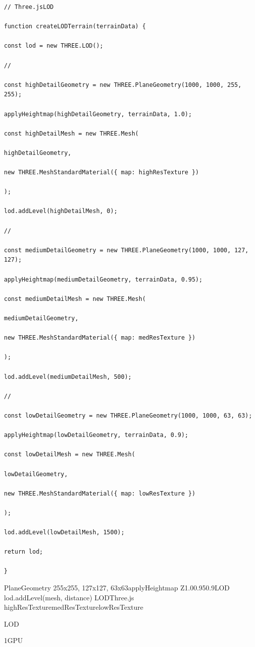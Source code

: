 \begin{lstlisting}[style=javascript]
// Three.jsLOD

function createLODTerrain(terrainData) {

const lod = new THREE.LOD();

// 

const highDetailGeometry = new THREE.PlaneGeometry(1000, 1000, 255, 255);

applyHeightmap(highDetailGeometry, terrainData, 1.0);

const highDetailMesh = new THREE.Mesh(

highDetailGeometry,

new THREE.MeshStandardMaterial({ map: highResTexture })

);

lod.addLevel(highDetailMesh, 0);

// 

const mediumDetailGeometry = new THREE.PlaneGeometry(1000, 1000, 127, 127);

applyHeightmap(mediumDetailGeometry, terrainData, 0.95);

const mediumDetailMesh = new THREE.Mesh(

mediumDetailGeometry,

new THREE.MeshStandardMaterial({ map: medResTexture })

);

lod.addLevel(mediumDetailMesh, 500);

// 

const lowDetailGeometry = new THREE.PlaneGeometry(1000, 1000, 63, 63);

applyHeightmap(lowDetailGeometry, terrainData, 0.9);

const lowDetailMesh = new THREE.Mesh(

lowDetailGeometry,

new THREE.MeshStandardMaterial({ map: lowResTexture })

);

lod.addLevel(lowDetailMesh, 1500);

return lod;

}

\end{lstlisting}

PlaneGeometry 255x255, 127x127, 63x63applyHeightmap Z1.00.950.9LOD
lod.addLevel(mesh, distance) LODThree.js
highResTexturemedResTexturelowResTexture

LOD

1GPU

